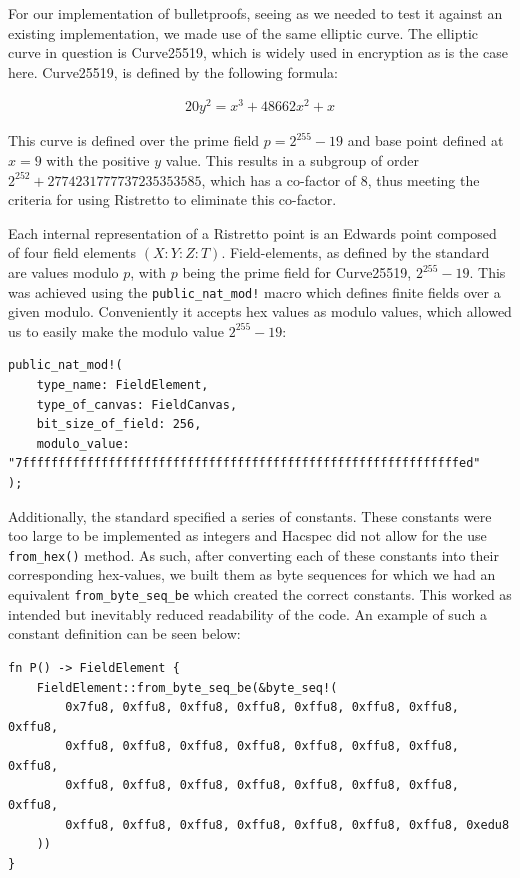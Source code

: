 \documentclass{article}
\newcommand{\eq}[1]{\begin{alignat*}{20}#1\end{alignat*}}
\begin{document}
For our implementation of bulletproofs, seeing as we needed to test it
against an existing implementation, we made use of the same elliptic
curve. The elliptic curve in question is Curve25519, which is widely
used in encryption as is the case here. Curve25519, is defined by the
following formula:

\eq{
	y^2 = x^3 + 48662x^2 + x
}

This curve is defined over the prime field $p = 2^{255} - 19$ and base
point defined at $x = 9$ with the positive $y$ value. This results
in a subgroup of order $2^{252} + 2774231777737235353585$, which has
a co-factor of $8$, thus meeting the criteria for using Ristretto to
eliminate this co-factor.

Each internal representation of a Ristretto point is an Edwards point
composed of four field elements $(X : Y : Z : T)$. Field-elements,
as defined by the standard are values modulo $p$, with $p$ being the
prime field for Curve25519, $2^{255} - 19$. This was achieved using
the \texttt{public\_nat\_mod!} macro which defines finite fields over
a given modulo. Conveniently it accepts hex values as modulo values,
which allowed us to easily make the modulo value $2^{255} - 19$:

\begin{lstlisting}
public_nat_mod!(
	type_name: FieldElement,
	type_of_canvas: FieldCanvas,
	bit_size_of_field: 256,
	modulo_value: "7fffffffffffffffffffffffffffffffffffffffffffffffffffffffffffffed"
);
\end{lstlisting}

Additionally, the standard specified a series of constants. These
constants were too large to be implemented as integers and Hacspec
did not allow for the use \texttt{from\_hex()} method. As such, after
converting each of these constants into their corresponding hex-values,
we built them as byte sequences for which we had an equivalent
\texttt{from\_byte\_seq\_be} which created the correct constants. This
worked as intended but inevitably reduced readability of the code. An
example of such a constant definition can be seen below:

\begin{lstlisting}
fn P() -> FieldElement {
	FieldElement::from_byte_seq_be(&byte_seq!(
		0x7fu8, 0xffu8, 0xffu8, 0xffu8, 0xffu8, 0xffu8, 0xffu8, 0xffu8,
		0xffu8, 0xffu8, 0xffu8, 0xffu8, 0xffu8, 0xffu8, 0xffu8, 0xffu8,
		0xffu8, 0xffu8, 0xffu8, 0xffu8, 0xffu8, 0xffu8, 0xffu8, 0xffu8,
		0xffu8, 0xffu8, 0xffu8, 0xffu8, 0xffu8, 0xffu8, 0xffu8, 0xedu8
	))
}
\end{lstlisting}
\end{document}
